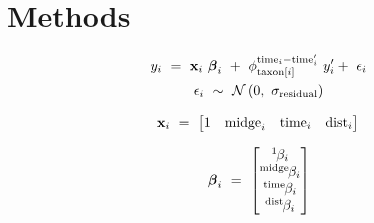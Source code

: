 

\section*{Methods}

\begin{equation} \label{eq:y-i}
\begin{gathered}
y_i~=~\mathbf{x}_i~{\boldsymbol\beta}_i~+~\phi_{\text{taxon}[i]}^{\text{time}_i-\text{time}\sp{\prime}_i}~y\sp{\prime}_i
        +~\epsilon_i \\
\epsilon_i~\sim~\mathcal{N}\left(0,~\sigma_{\text{residual}}\right)
\end{gathered}
\end{equation}

\begin{equation} \label{eq:x-vec}
\mathbf{x}_i~=~\begin{bmatrix} 1 & \text{midge}_i & \text{time}_i & \text{dist}_i \end{bmatrix} \\
\end{equation}

\begin{equation} \label{eq:beta-vec}
{\boldsymbol\beta}_i~=~\begin{bmatrix} {}^1\hspace*{-1pt}\beta_i \\ {}^\text{midge}\hspace*{-1pt}\beta_i \\
    {}^\text{time}\hspace*{-1pt}\beta_i \\ {}^\text{dist}\hspace*{-1pt}\beta_i \end{bmatrix}
\end{equation}

